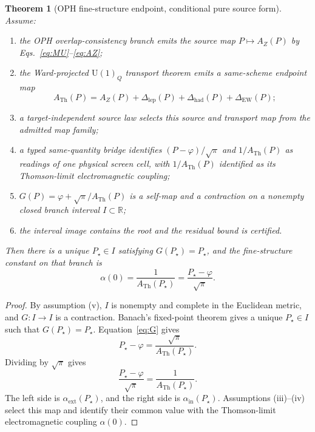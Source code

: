 \documentclass[11pt]{article}
\newtheorem{theorem}{Theorem}
\theoremstyle{remark}
\newcommand{\U}{\mathrm{U}}
\newcommand{\ATh}{A_{\mathrm{Th}}}
\newcommand{\AZ}{A_Z}
\newcommand{\Dlep}{\Delta_{\mathrm{lep}}}
\newcommand{\Dhad}{\Delta_{\mathrm{had}}}
\newcommand{\DEW}{\Delta_{\mathrm{EW}}}
\begin{document}
\begin{theorem}[OPH fine-structure endpoint, conditional pure source form]
Assume:
\begin{enumerate}[label=(\roman*)]
\item the OPH overlap-consistency branch emits the source map \(P\mapsto \AZ(P)\) by Eqs.~\eqref{eq:MU}--\eqref{eq:AZ};
\item the Ward-projected \(\U(1)_Q\) transport theorem emits a same-scheme endpoint map
\[
\ATh(P)=\AZ(P)+\Dlep(P)+\Dhad(P)+\DEW(P);
\]
\item a target-independent source law selects this source and transport map from the admitted map family;
\item a typed same-quantity bridge identifies \((P-\varphi)/\sqrt\pi\) and \(1/\ATh(P)\) as readings of one physical screen cell, with \(1/\ATh(P)\) identified as its Thomson-limit electromagnetic coupling;
\item \(G(P)=\varphi+\sqrt\pi/\ATh(P)\) is a self-map and a contraction on a nonempty closed branch interval \(I\subset\mathbb R\);
\item the interval image contains the root and the residual bound is certified.
\end{enumerate}
Then there is a unique \(P_\star\in I\) satisfying \(G(P_\star)=P_\star\), and the fine-structure constant on that branch is
\[
\alpha(0)=\frac{1}{\ATh(P_\star)}=\frac{P_\star-\varphi}{\sqrt\pi}.
\]
\end{theorem}

\begin{proof}
By assumption (v), \(I\) is nonempty and complete in the Euclidean metric,
and \(G:I\to I\) is a contraction. Banach's fixed-point theorem gives a unique \(P_\star\in I\) such that \(G(P_\star)=P_\star\). Equation~\eqref{eq:G} gives
\[
P_\star-\varphi=\frac{\sqrt\pi}{\ATh(P_\star)}.
\]
Dividing by \(\sqrt\pi\) gives
\[
\frac{P_\star-\varphi}{\sqrt\pi}=\frac{1}{\ATh(P_\star)}.
\]
The left side is \(\alpha_{\mathrm{ext}}(P_\star)\), and the right side is \(\alpha_{\mathrm{in}}(P_\star)\). Assumptions (iii)--(iv) select this map and identify their common value with the Thomson-limit electromagnetic coupling \(\alpha(0)\).
\end{proof}
\end{document}
